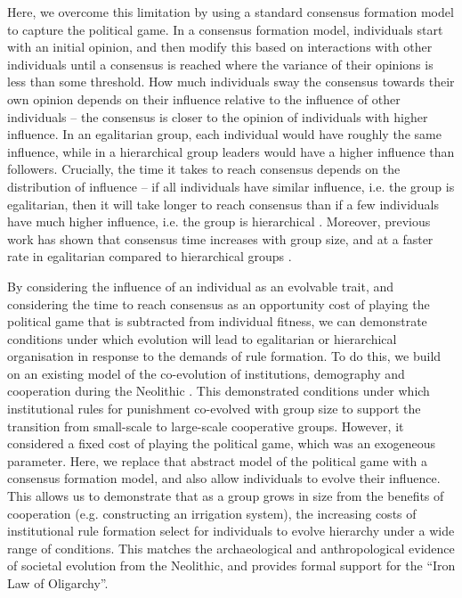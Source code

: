 \documentclass{rstb}
\begin{document}
\begin{linenumbers}
Here, we overcome this limitation by using a standard consensus formation model \cite{Gavrilets:2016:a,Perret:2022:a} to capture the political game. In a consensus formation model, individuals start with an initial opinion, and then modify this based on interactions with other individuals until a consensus is reached where the variance of their opinions is less than some threshold. How much individuals sway the consensus towards their own opinion depends on their influence relative to the influence of other individuals -- the consensus is closer to the opinion of individuals with higher influence. In an egalitarian group, each individual would have roughly the same influence, while in a hierarchical group leaders would have a higher influence than followers. Crucially, the time it takes to reach consensus depends on the distribution of influence -- if all individuals have similar influence, i.e. the group is egalitarian, then it will take longer to reach consensus than if a few individuals have much higher influence, i.e. the group is hierarchical \cite{Gavrilets:2016:a,Perret:2020:a}. Moreover, previous work has shown that consensus time increases with group size, and at a faster rate in egalitarian compared to hierarchical groups \cite{Perret:2020:a}.

By considering the influence of an individual as an evolvable trait, and considering the time to reach consensus as an opportunity cost of playing the political game that is subtracted from individual fitness, we can demonstrate conditions under which evolution will lead to egalitarian or hierarchical organisation in response to the demands of rule formation. To do this, we build on an existing model of the co-evolution of institutions, demography and cooperation during the Neolithic \cite{Powers:2013:a}. This demonstrated conditions under which institutional rules for punishment co-evolved with group size to support the transition from small-scale to large-scale cooperative groups. However, it considered a fixed cost of playing the political game, which was an exogeneous parameter. Here, we replace that abstract model of the political game with a consensus formation model, and also allow individuals to evolve their influence. This allows us to demonstrate that as a group grows in size from the benefits of cooperation (e.g. constructing an irrigation system), the increasing costs of institutional rule formation select for individuals to evolve hierarchy under a wide range of conditions. This matches the archaeological and anthropological evidence of societal evolution from the Neolithic, and provides formal support for the ``Iron Law of Oligarchy''.


\end{linenumbers}
\end{document}
